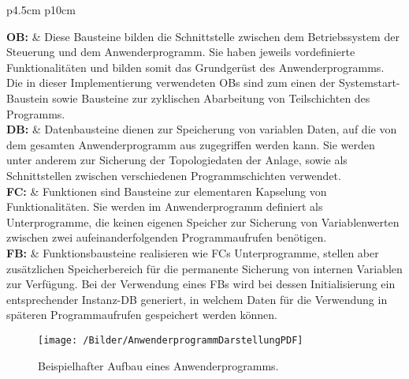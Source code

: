 			
			\begin{longtable}{{p{4.5cm} p{10cm}}}
				
				\textbf{\ac{OB}:} & Diese Bausteine bilden die Schnittstelle zwischen dem Betriebssystem der Steuerung und dem Anwenderprogramm. Sie haben jeweils vordefinierte Funktionalitäten und bilden somit das Grundgerüst des Anwenderprogramms. Die in dieser Implementierung verwendeten \ac{OB}s sind zum einen der Systemstart-Baustein sowie Bausteine zur zyklischen Abarbeitung von Teilschichten des Programms.\\[0.5cm]
				\textbf{\ac{DB}:} & Datenbausteine dienen zur Speicherung von variablen Daten, auf die von dem gesamten Anwenderprogramm  aus zugegriffen werden kann. Sie werden unter anderem zur Sicherung der Topologiedaten der Anlage, sowie als Schnittstellen zwischen verschiedenen Programmschichten verwendet.\\[0.5cm]
				\textbf{\ac{FC}:} & Funktionen sind Bausteine zur elementaren Kapselung von Funktionalitäten. Sie werden im Anwenderprogramm definiert als Unterprogramme, die keinen eigenen Speicher zur Sicherung von Variablenwerten zwischen zwei aufeinanderfolgenden Programmaufrufen benötigen.\\[0.5cm]
				\textbf{\ac{FB}:} & Funktionsbausteine realisieren wie \ac{FC}s Unterprogramme, stellen aber zusätzlichen Speicherbereich für die permanente Sicherung von internen Variablen zur Verfügung. Bei der Verwendung eines \ac{FB}s wird bei dessen Initialisierung ein entsprechender Instanz-\ac{DB} generiert, in welchem Daten für die Verwendung in späteren Programmaufrufen gespeichert werden können.\\[0.5cm]
				
			\end{longtable}
			
			\begin{figure}[h]
				\centering
				\texttt{[image: /Bilder/AnwenderprogrammDarstellungPDF]}
				\vspace{0.2cm}
				\caption{Beispielhafter Aufbau eines Anwenderprogramms.}\label{Anwenderprogramm Darstellung}
			\end{figure}
			
